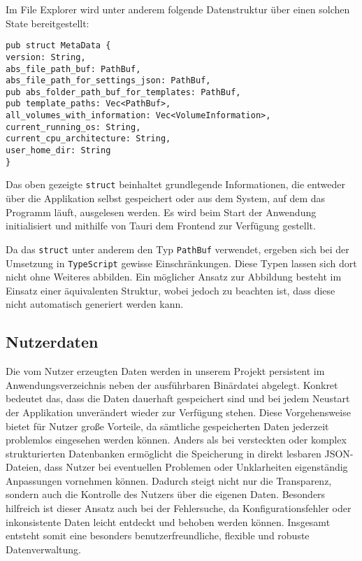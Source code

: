 \newpage
Im File Explorer wird unter anderem folgende Datenstruktur über einen solchen State bereitgestellt:

{\small
\begin{verbatim}
pub struct MetaData {
version: String,
abs_file_path_buf: PathBuf,
abs_file_path_for_settings_json: PathBuf,
pub abs_folder_path_buf_for_templates: PathBuf,
pub template_paths: Vec<PathBuf>,
all_volumes_with_information: Vec<VolumeInformation>,
current_running_os: String,
current_cpu_architecture: String,
user_home_dir: String
}
\end{verbatim}
}

Das oben gezeigte \verb|struct| beinhaltet grundlegende Informationen, die entweder über die Applikation selbst gespeichert oder
aus dem System, auf dem das Programm läuft, ausgelesen werden. Es wird beim Start der Anwendung initialisiert und mithilfe von
Tauri dem Frontend zur Verfügung gestellt.

Da das \verb|struct| unter anderem den Typ \verb|PathBuf| verwendet, ergeben sich bei der Umsetzung in \verb|TypeScript| gewisse
Einschränkungen. Diese Typen lassen sich dort nicht ohne Weiteres abbilden. Ein möglicher Ansatz zur Abbildung besteht im Einsatz
einer äquivalenten Struktur, wobei jedoch zu beachten ist, dass diese nicht automatisch generiert werden kann.

\subsection{Nutzerdaten}
Die vom Nutzer erzeugten Daten werden in unserem Projekt persistent im
Anwendungsverzeichnis neben der ausführbaren Binärdatei abgelegt. Konkret bedeutet das, dass die
Daten dauerhaft gespeichert sind und bei jedem Neustart der Applikation unverändert wieder zur
Verfügung stehen. Diese Vorgehensweise bietet für Nutzer große Vorteile, da sämtliche gespeicherten
Daten jederzeit problemlos eingesehen werden können. Anders als bei versteckten oder komplex
strukturierten Datenbanken ermöglicht die Speicherung in direkt lesbaren JSON-Dateien, dass Nutzer
bei eventuellen Problemen oder Unklarheiten eigenständig Anpassungen vornehmen können. Dadurch
steigt nicht nur die Transparenz, sondern auch die Kontrolle des Nutzers über die eigenen Daten.
Besonders hilfreich ist dieser Ansatz auch bei der Fehlersuche, da Konfigurationsfehler oder
inkonsistente Daten leicht entdeckt und behoben werden können. Insgesamt entsteht somit eine
besonders benutzerfreundliche, flexible und robuste Datenverwaltung.
